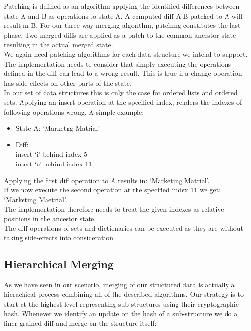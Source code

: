 Patching is defined as an algorithm applying the identified differences between state A and B as operations to state A.
A computed diff A-B patched to A will result in B.
For our three-way merging algorithm, patching constitutes the last phase. 
Two merged diffs are applied as a patch to the common ancestor state resulting in the actual merged state.\\
We again need patching algorithms for each data structure we intend to support.
The implementation needs to consider that simply executing the operations defined in the diff can lead to a wrong result.
This is true if a change operation has side effects on other parts of the state.\\
In our set of data structures this is only the case for ordered lists and ordered sets.
Applying an insert operation at the specified index, renders the indexes of following operations wrong.
A simple example:

\begin{itemize}
\item State A: `Marketng Matrial'
\item Diff:\\
insert `i' behind index 5\\
insert `e' behind index 11
\end{itemize}

Applying the first diff operation to A results in: `Marketing Matrial'.\\
If we now execute the second operation at the specified index 11 we get: `Marketing Maetrial'.\\
The implementation therefore needs to treat the given indexes as relative positions in the ancestor state.\\
The diff operations of sets and dictionaries can be executed as they are without taking side-effects into consideration.

\subsection{Hierarchical Merging}
As we have seen in our scenario, merging of our structured data is actually a hierachical process combining all of the described algorithms.
Our strategy is to start at the highest-level representing sub-structures using their cryptographic hash.
Whenever we identify an update on the hash of a sub-structure we do a finer grained diff and merge on the structure itself:

